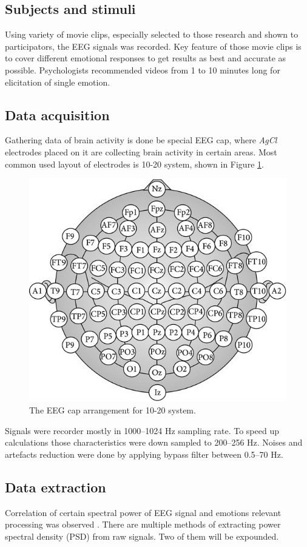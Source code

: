 \documentclass[10pt,journal,compsoc,twoside]{IEEEtran}
\newcommand{\Ref}[2]{#2 \ref{#1}}
\begin{document}
\subsection{Subjects and stimuli}
Using variety of movie clips, especially selected to those research and shown to participators, the EEG signals was recorded. Key feature of those movie clips is to cover different emotional responses to get results as best and accurate as possible. Psychologists recommended videos from 1 to 10 minutes long for elicitation of single emotion\cite{SchaeferNilsSanchezPhilippot2010}.

\subsection{Data acquisition} 


Gathering data of brain activity is done be special EEG cap, where \textit{AgCl} electrodes placed on it are collecting brain activity in certain areas. Most common used layout of electrodes is 10-20 system, shown in \Ref{fig:1020electrodes}{Figure}.

\begin{figure}[ht]
	\centering
	\includegraphics[width=0.7\linewidth]{10_20_electrodes}
	\caption{The EEG cap arrangement for 10-20 system.\cite{JirayucharoensakSuwichaPanngumIsrasenaPasin2014}}
	\label{fig:1020electrodes}
\end{figure}

Signals were recorder mostly in \numrange[range-phrase = --]{1000}{1024} Hz sampling rate. To speed up calculations those characteristics were down sampled to \numrange[range-phrase = --]{200}{256} Hz. Noises and artefacts reduction were done by applying bypass filter between  \numrange{0.5}{70} Hz.
\subsection{Data extraction}
Correlation of certain spectral power of EEG signal and emotions relevant processing was observed \cite{AftanasSavotinaMakhnev2005}. There are multiple methods of extracting power spectral density (PSD) from raw signals. Two of them will be expounded.
\end{document}
